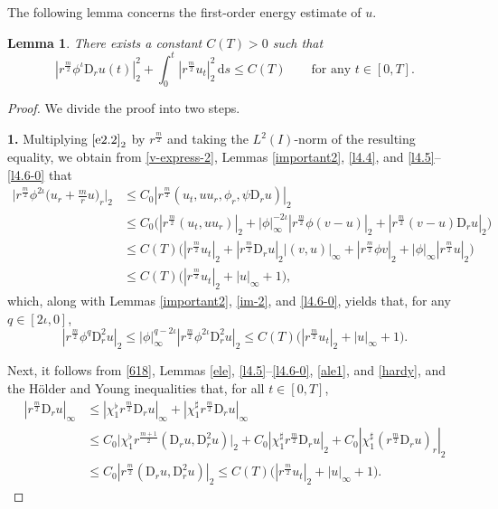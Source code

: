 \documentclass[11pt,reqno]{amsart}
\newtheorem{lem}{Lemma}[section]
\numberwithin{rk}{section}
\numberwithin{prop}{section}
\numberwithin{mydef}{section}
\numberwithin{lem}{section}
\numberwithin{equation}{section}
\numberwithin{thm}{section}
\begin{document}
The following lemma concerns the first-order energy estimate of $u$.
\begin{lem}\label{l4.6}
There exists a constant $C(T)>0$ such that 
\begin{equation*} 
|r^{\frac{m}{2}}\phi^\iota\mathrm{D}_r u(t)|_2^2+\int_0^t |r^{\frac{m}{2}}u_t|_2^2\,\mathrm{d}s\leq C(T)\qquad \text{for any $t\in [0,T]$}.
\end{equation*}
\end{lem}
\begin{proof}
We divide the proof into two steps.

\smallskip
\textbf{1.}  Multiplying $\eqref{e2.2}_2$ by $r^\frac{m}{2}$ and taking the $L^2(I)$-norm of the resulting equality, we obtain from \eqref{v-express-2}, Lemmas \ref{important2}, \ref{l4.4}, and \ref{l4.5}--\ref{l4.6-0} that   
\begin{equation*}
\begin{aligned}
\Big|r^{\frac{m}{2}}\phi^{2\iota}\big(u_r+\frac{m}{r}u\big)_r\Big|_2&\leq C_0 |r^{\frac{m}{2}}(u_t,uu_r,\phi_r,\psi\mathrm{D}_r u)|_2 \\
&\leq  C_0\big(|r^{\frac{m}{2}}(u_t, uu_r)|_2+ |\phi|_\infty^{-2\iota}|r^{\frac{m}{2}} \phi(v-u)|_2+ |r^{\frac{m}{2}} (v-u)\mathrm{D}_r u|_2\big) \\
&\leq  C(T)\big(|r^{\frac{m}{2}}u_t|_2+ |r^\frac{m}{2}\mathrm{D}_r u|_2|(v,u)|_\infty+|r^\frac{m}{2}\phi v|_2 +|\phi|_\infty|r^{\frac{m}{2}}u|_2\big)\\
&\leq C(T)\big(|r^{\frac{m}{2}}u_t|_2+|u|_\infty+1\big),
\end{aligned}
\end{equation*}
which, along with Lemmas \ref{important2}, \ref{im-2}, and \ref{l4.6-0}, yields that, for any $q\in [2\iota,0]$,
\begin{equation}\label{618}
|r^{\frac{m}{2}}\phi^{q}\mathrm{D}_r^2 u|_2\leq |\phi|_\infty^{q-2\iota} |r^{\frac{m}{2}}\phi^{2\iota}\mathrm{D}_r^2 u|_2\leq C(T)\big(|r^{\frac{m}{2}}u_t|_2+|u|_\infty+1\big).
\end{equation}

Next, it follows from \eqref{618}, Lemmas \ref{ele}, \ref{l4.5}--\ref{l4.6-0}, \ref{ale1}, and \ref{hardy}, and the H\"older and Young inequalities that, for all $t\in[0,T]$,
\begin{equation}\label{6.4-d}
\begin{aligned}
|r^\frac{m}{2}\mathrm{D}_r u|_\infty&\leq |\chi_1^\flat r^\frac{m}{2}\mathrm{D}_r u|_\infty+ |\chi_1^\sharp r^\frac{m}{2}\mathrm{D}_r u|_\infty\\
&\leq C_0\big|\chi_1^\flat r^\frac{m+1}{2} (\mathrm{D}_r u,\mathrm{D}_r^2 u)\big|_2 +C_0 |\chi_1^\sharp r^{\frac{m}{2}}\mathrm{D}_r u|_2+C_0|\chi_1^\sharp (r^\frac{m}{2}\mathrm{D}_r u)_r|_2 \\
&\leq C_0 |r^{\frac{m}{2}}(\mathrm{D}_r u,\mathrm{D}_r^2 u) |_2\leq C(T)\big(|r^{\frac{m}{2}}u_t|_2+|u|_\infty+1\big).
\end{aligned}
\end{equation}


\end{proof}
\end{document}
